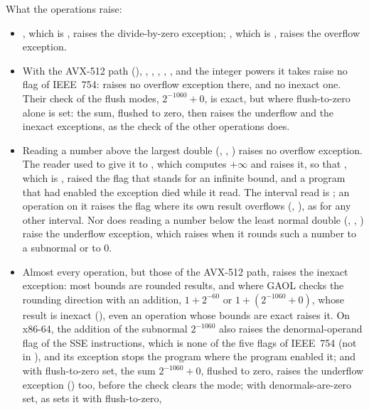 \noindent
What the operations raise:
\begin{itemize}
\item {}, which is , raises the
  divide-by-zero exception; , which is
  , raises the overflow exception.
\item With the AVX-512 path (), \code{+}, \code{-}, \code{*},
  \code{/}, ,  and the integer powers it takes raise no
  flag of IEEE~754:  raises no overflow exception there,
  and  no inexact one. Their check of the flush modes,
  $2^{-1060}+0$, is exact, but where flush-to-zero alone is set: the sum,
  flushed to zero, then raises the underflow and the inexact exceptions, as the
  check of the other operations does.\newinvfive
\item Reading a number above the largest double (, ,
  ) raises no overflow exception. The reader used to give it to
  , which computes $+\infty$ and raises it, so that
  , which is , raised the flag that stands for an
  infinite bound, and a program that had enabled the exception died while it
  read. The interval read is ; an operation on
  it raises the flag where its own result overflows (,
  ), as for any other interval. Nor does reading a number
  below the least normal double (, ,
  ) raise the underflow exception, which 
  raises when it rounds such a number to a subnormal or to $0$.\newinvfive
\item Almost every operation, but those of the AVX-512 path, raises the inexact
  exception: most bounds are
  rounded results, and where GAOL checks the rounding direction with an
  addition, $1+2^{-60}$ or $1+(2^{-1060}+0)$, whose result is inexact
  (), even an operation whose bounds are exact
  raises it. On x86-64, the addition of the subnormal $2^{-1060}$ also raises
  the denormal-operand flag of the SSE instructions, which is none of the five
  flags of IEEE~754 (not in ), and its exception stops
  the program where the program enabled it; and with flush-to-zero set, the
  sum $2^{-1060}+0$, flushed to zero, raises the underflow exception
  () too, before the check clears the mode; with
  denormals-are-zero set, as  sets it with flush-to-zero,

\end{itemize}
